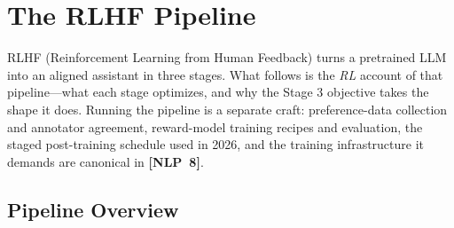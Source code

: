 \section{The RLHF Pipeline}
\label{sec:rlhf_pipeline}

RLHF (Reinforcement Learning from Human Feedback) turns a pretrained LLM into an aligned assistant in three stages. What follows is the \textit{RL} account of that pipeline---what each stage optimizes, and why the Stage 3 objective takes the shape it does. Running the pipeline is a separate craft: preference-data collection and annotator agreement, reward-model training recipes and evaluation, the staged post-training schedule used in 2026, and the training infrastructure it demands are canonical in \textbf{[NLP~8]}.

\subsection{Pipeline Overview}

